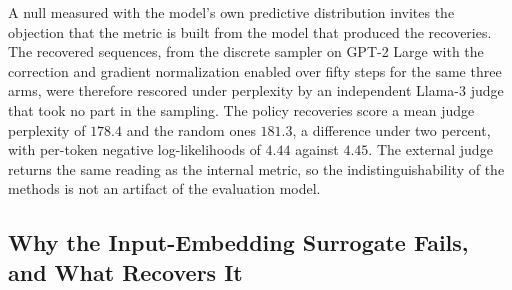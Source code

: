A null measured with the model's own predictive distribution invites the objection that the metric is built from the model that produced the recoveries. The recovered sequences, from the discrete sampler on GPT-2 Large with the correction and gradient normalization enabled over fifty steps for the same three arms, were therefore rescored under perplexity by an independent Llama-3 judge that took no part in the sampling. The policy recoveries score a mean judge perplexity of $178.4$ and the random ones $181.3$, a difference under two percent, with per-token negative log-likelihoods of $4.44$ against $4.45$.
The external judge returns the same reading as the internal metric, so the indistinguishability of the methods is not an artifact of the evaluation model.

\subsection{Why the Input-Embedding Surrogate Fails, and What Recovers It}
\label{sec:results-linradius}

